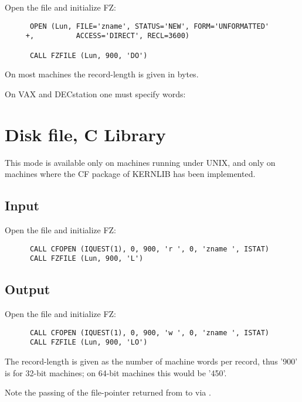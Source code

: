 Open the file and initialize FZ:

\begin{verbatim}
      OPEN (Lun, FILE='zname', STATUS='NEW', FORM='UNFORMATTED'
     +,          ACCESS='DIRECT', RECL=3600)

      CALL FZFILE (Lun, 900, 'DO')
\end{verbatim}

On most machines the record-length is given in bytes.

On VAX and DECstation one must specify words: 

\section{Disk file, C Library}

This mode is available only on machines running under UNIX,
and only on machines where the CF package of KERNLIB has
been implemented.

\subsection*{Input}

Open the file and initialize FZ:

\begin{verbatim}
      CALL CFOPEN (IQUEST(1), 0, 900, 'r ', 0, 'zname ', ISTAT)
      CALL FZFILE (Lun, 900, 'L')
\end{verbatim}

\subsection{Output}

Open the file and initialize FZ:

\begin{verbatim}
      CALL CFOPEN (IQUEST(1), 0, 900, 'w ', 0, 'zname ', ISTAT)
      CALL FZFILE (Lun, 900, 'LO')
\end{verbatim}

The record-length is given as the number of machine words per
record, thus '900' is for 32-bit machines;
on 64-bit machines this would be '450'.

Note the passing of the file-pointer returned from 
to  via .
